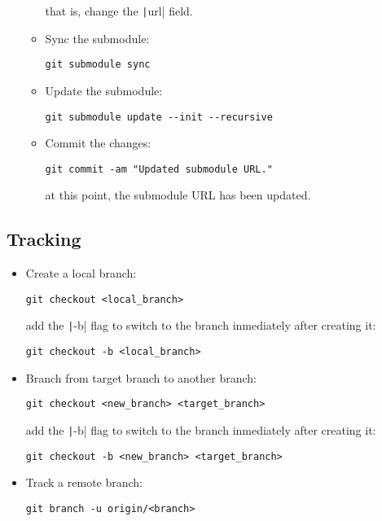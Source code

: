 \begin{itemize}
\begin{itemize}
        that is, change the \texttt|url| field.
        \item Sync the submodule:
        \begin{verbatim}
git submodule sync
        \end{verbatim}
        \item Update the submodule:
        \begin{verbatim}
git submodule update --init --recursive
        \end{verbatim}
        \item Commit the changes:
        \begin{verbatim}
git commit -am "Updated submodule URL."
        \end{verbatim}
        at this point, the submodule URL has been updated.
    \end{itemize}
\end{itemize}


\subsection{Tracking}

\begin{itemize}
    \item Create a local branch:
    \begin{verbatim}
git checkout <local_branch>
    \end{verbatim}
    add the \texttt|-b| flag to switch to the branch inmediately after creating it:
    \begin{verbatim}
git checkout -b <local_branch>
    \end{verbatim}
    \item Branch from target branch to another branch:
    \begin{verbatim}
git checkout <new_branch> <target_branch>
    \end{verbatim}
    add the \texttt|-b| flag to switch to the branch inmediately after creating it:
    \begin{verbatim}
git checkout -b <new_branch> <target_branch>
    \end{verbatim}
    \item Track a remote branch:
    \begin{verbatim}
git branch -u origin/<branch>
    \end{verbatim}
\end{itemize}
